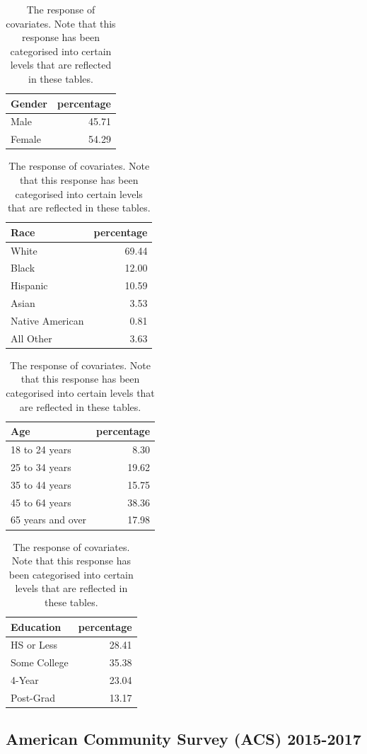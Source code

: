 \documentclass{monashthesis}
\begin{document}
\begin{table}
\caption{\label{tab:covariate-tables}The response of covariates. Note that this response has been categorised into certain levels that are reflected in these tables.}

\centering
\begin{tabular}[t]{lr}
\toprule
Gender & percentage\\
\midrule
Male & 45.71\\
Female & 54.29\\
\bottomrule
\end{tabular}
\centering
\begin{tabular}[t]{lr}
\toprule
Race & percentage\\
\midrule
White & 69.44\\
Black & 12.00\\
Hispanic & 10.59\\
Asian & 3.53\\
Native American & 0.81\\
\addlinespace
All Other & 3.63\\
\bottomrule
\end{tabular}
\centering
\begin{tabular}[t]{lr}
\toprule
Age & percentage\\
\midrule
18 to 24 years & 8.30\\
25 to 34 years & 19.62\\
35 to 44 years & 15.75\\
45 to 64 years & 38.36\\
65 years and over & 17.98\\
\bottomrule
\end{tabular}
\centering
\begin{tabular}[t]{lr}
\toprule
Education & percentage\\
\midrule
HS or Less & 28.41\\
Some College & 35.38\\
4-Year & 23.04\\
Post-Grad & 13.17\\
\bottomrule
\end{tabular}
\end{table}

\hypertarget{american-community-survey-acs-2015-2017}{%
\subsection{American Community Survey (ACS) 2015-2017}\label{american-community-survey-acs-2015-2017}}
\end{document}
